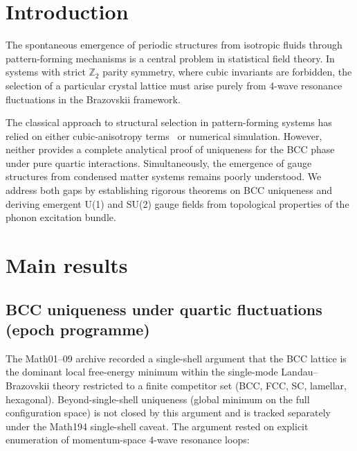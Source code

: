 \maketitle

\section{Introduction}
The spontaneous emergence of periodic structures from isotropic fluids through
pattern-forming mechanisms is a central problem in statistical field theory. In systems
with strict $\mathbb{Z}_2$ parity symmetry, where cubic invariants are forbidden, the selection
of a particular crystal lattice must arise purely from 4-wave resonance fluctuations in the
Brazovskii framework.

The classical approach to structural selection in pattern-forming systems has relied on
either cubic-anisotropy terms~\cite{Alexander1978} or numerical simulation. However, neither
provides a complete analytical proof of uniqueness for the BCC phase under pure quartic
interactions. Simultaneously, the emergence of gauge structures from condensed matter systems
remains poorly understood. We address both gaps by establishing rigorous theorems on BCC
uniqueness and deriving emergent U(1) and SU(2) gauge fields from topological properties
of the phonon excitation bundle.

\section{Main results}

\subsection{BCC uniqueness under quartic fluctuations
(epoch programme)}
The Math01--09 archive recorded a single-shell argument that the BCC
lattice is the dominant local free-energy minimum within the single-mode
Landau--Brazovskii theory restricted to a finite competitor set
(BCC, FCC, SC, lamellar, hexagonal). Beyond-single-shell uniqueness
(global minimum on the full configuration space) is not closed by
this argument and is tracked separately under the Math194 single-shell
caveat. The argument rested on explicit enumeration of momentum-space
4-wave resonance loops:

